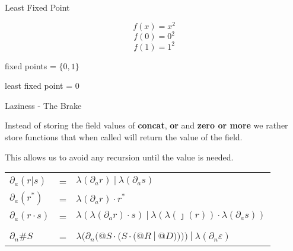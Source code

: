 \documentclass[10pt]{beamer}
\begin{document}
\begin{frame}[fragile]{Least Fixed Point}
\begin{center}

$$f(x) = x^2$$
$$f(0) = 0^2$$
$$f(1) = 1^2$$

fixed points = $\{0, 1\}$

least fixed point = $0$

\end{center}
\end{frame}

\begin{frame}{Laziness - The Brake}


Instead of storing the field values of \textbf{concat}, \textbf{or} and \textbf{zero or more} we rather store functions that when called will return the value of the field.

This allows us to avoid any recursion until the value is needed.

\begin{center}
\begin{tabular}{l c l}
$\partial_a (r | s) $ & = & $\lambda(\partial_a r)\ |\  \lambda(\partial_a s) $ \\
$\partial_a (r^{*}) $ & = & $\lambda(\partial_a r) \cdot r^{*} $ \\
$\partial_a (r \cdot s) $ & = & $\lambda(\lambda(\partial_a r) \cdot s)\ |\  \lambda(\lambda(\jmath(r)) \cdot \lambda(\partial_a s)) $ \\
\\
$\partial_n \#S$ &=& $\lambda(\partial_n(@S \cdot (S \cdot ( @R\ |\ @D ))))\ |\ \lambda(\partial_n \varepsilon)$ \\
\end{tabular}
\end{center}
\end{frame}
\end{document}
